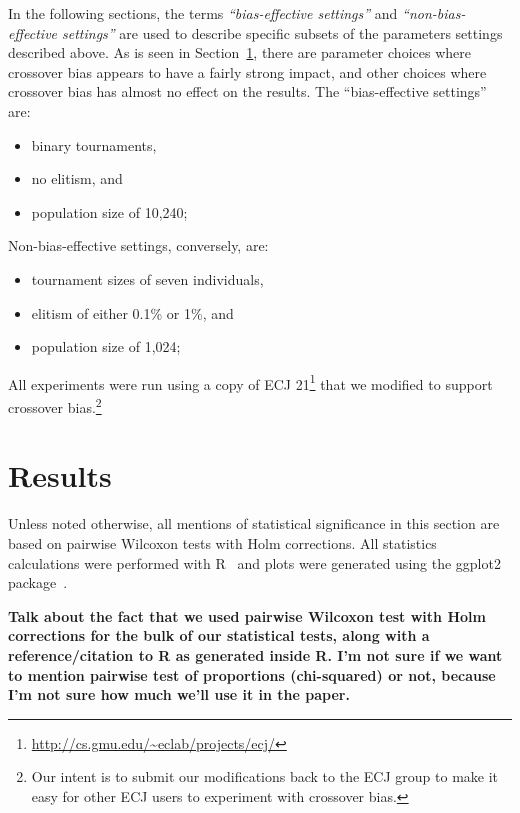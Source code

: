 \documentclass{sig-alternate}
\begin{document}

In the following sections, the terms \emph{``bias-effective settings''} and \emph{``non-bias-effective settings''} 
are used to
describe specific subsets of the parameters settings described above. As is seen in Section~\ref{sec:Results}, 
there are parameter choices where crossover bias appears to have a fairly strong impact, and other choices 
where crossover bias has almost no effect on the results. The ``bias-effective settings'' are:
\begin{itemize}
\item binary tournaments,
\item no elitism, and
\item population size of 10,240;
\end{itemize}
Non-bias-effective settings, conversely, are:
\begin{itemize}
\item tournament sizes of seven individuals,
\item elitism of either 0.1\% or 1\%, and
\item population size of 1,024;
\end{itemize}

All experiments were run using a copy of ECJ 21\footnote{\url{http://cs.gmu.edu/~eclab/projects/ecj/}} 
that we modified to support crossover bias.\footnote{Our intent is to submit our modifications back to the 
ECJ group to make it easy for other ECJ users to experiment with crossover bias.}

\section{Results} \label{sec:Results}

Unless noted otherwise, all mentions of statistical significance in this section are based on 
pairwise Wilcoxon tests with Holm corrections. All statistics calculations were performed with R~\cite{R} 
and plots were generated using the ggplot2 package~\cite{ggplot2Book}.

\textbf{Talk about the fact that we used pairwise Wilcoxon test with Holm corrections for the bulk of our statistical 
tests, along with a reference/citation to R as generated inside R. I'm not sure if we want to mention pairwise test of 
proportions (chi-squared) or not, because I'm not sure how much we'll use it in the paper.}
\end{document}
